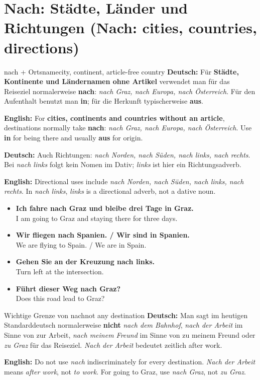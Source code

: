 \documentclass[a4paper,11pt]{article}
\newcommand{\GermanText}[1]{\textbf{Deutsch: }#1\par}
\newcommand{\EnglishText}[1]{{\small\color{SoftGray}\textbf{English: }#1\par}}
\newcommand{\ExampleItem}[2]{\item \textbf{#1}\\{\small\color{SoftGray}#2}}
\begin{document}
\section{Nach: Städte, Länder und Richtungen (Nach: cities, countries, directions)}
\begin{grammarentry}{nach + Ortsname}{city, continent, article-free country}
\GermanText{Für \textbf{Städte, Kontinente und Ländernamen ohne Artikel} verwendet man für das Reiseziel normalerweise \textbf{nach}: \emph{nach Graz, nach Europa, nach Österreich}. Für den Aufenthalt benutzt man \textbf{in}; für die Herkunft typischerweise \textbf{aus}.}
\EnglishText{For \textbf{cities, continents and countries without an article}, destinations normally take \textbf{nach}: \emph{nach Graz, nach Europa, nach Österreich}. Use \textbf{in} for being there and usually \textbf{aus} for origin.}
\GermanText{Auch Richtungen: \emph{nach Norden, nach Süden, nach links, nach rechts}. Bei \emph{nach links} folgt kein Nomen im Dativ; \emph{links} ist hier ein Richtungsadverb.}
\EnglishText{Directional uses include \emph{nach Norden, nach Süden, nach links, nach rechts}. In \emph{nach links}, \emph{links} is a directional adverb, not a dative noun.}
\end{grammarentry}
\begin{exbox}\begin{itemize}
\ExampleItem{Ich fahre nach Graz und bleibe drei Tage in Graz.}{I am going to Graz and staying there for three days.}
\ExampleItem{Wir fliegen nach Spanien. / Wir sind in Spanien.}{We are flying to Spain. / We are in Spain.}
\ExampleItem{Gehen Sie an der Kreuzung nach links.}{Turn left at the intersection.}
\ExampleItem{Führt dieser Weg nach Graz?}{Does this road lead to Graz?}
\end{itemize}\end{exbox}
\begin{grammarentry}{Wichtige Grenze von nach}{not any destination}
\GermanText{Man sagt im heutigen Standarddeutsch normalerweise \textbf{nicht} \emph{nach dem Bahnhof}, \emph{nach der Arbeit} im Sinne von \glqq zur Arbeit\grqq{}, \emph{nach meinem Freund} im Sinne von \glqq zu meinem Freund\grqq{} oder \emph{zu Graz} für das Reiseziel. \emph{Nach der Arbeit} bedeutet zeitlich \glqq after work\grqq{}.}
\EnglishText{Do not use \emph{nach} indiscriminately for every destination. \emph{Nach der Arbeit} means \emph{after work}, not \emph{to work}. For going to Graz, use \emph{nach Graz}, not \emph{zu Graz}.}
\end{grammarentry}
\end{document}
